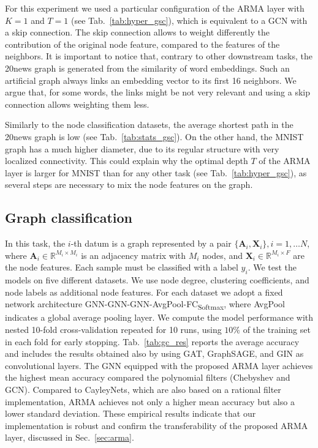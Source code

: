 \documentclass{article}
\def\X{{\mathbf X}}
\def\A{{\mathbf A}}
\begin{document}
For this experiment we used a particular configuration of the ARMA layer with $K=1$ and $T=1$ (see Tab.~\ref{tab:hyper_gsc}), which is equivalent to a GCN with a skip connection.
The skip connection allows to weight differently the contribution of the original node feature, compared to the features of the neighbors.
It is important to notice that, contrary to other downstream tasks, the 20news graph is generated from the similarity of word embeddings. 
Such an artificial graph always links an embedding vector to its first 16 neighbors.
We argue that, for some words, the links might be not very relevant and using a skip connection allows weighting them less.

Similarly to the node classification datasets, the average shortest path in the 20news graph is low (see Tab.~\ref{tab:stats_gsc}).
On the other hand, the MNIST graph has a much higher diameter, due to its regular structure with very localized connectivity.
This could explain why the optimal depth $T$ of the ARMA layer is larger for MNIST than for any other task (see Tab.~\ref{tab:hyper_gsc}), as several steps are necessary to mix the node features on the graph.

\subsection{Graph classification}
In this task, the $i$-th datum is a graph represented by a pair $\{ \A_i, \X_i \}, i=1, \dots N$, where $\A_i \in \mathbb{R}^{M_i \times M_i}$ is an adjacency matrix with $M_i$ nodes, and $\X_i \in \mathbb{R}^{M_i \times F}$ are the node features.
Each sample must be classified with a label $y_i$.
We test the models on five different datasets.
We use node degree, clustering coefficients, and node labels as additional node features.
For each dataset we adopt a fixed network architecture GNN-GNN-GNN-AvgPool-FC\textsubscript{Softmax}, where AvgPool indicates a global average pooling layer.
We compute the model performance with nested 10-fold cross-validation repeated for 10 runs, using $10\%$ of the training set in each fold for early stopping. 
Tab.~\ref{tab:gc_res} reports the average accuracy and includes the results obtained also by using GAT, GraphSAGE, and GIN as convolutional layers.
The GNN equipped with the proposed ARMA layer achieves the highest mean accuracy compared the polynomial filters (Chebyshev and GCN).
Compared to CayleyNets, which are also based on a rational filter implementation, ARMA achieves not only a higher mean accuracy but also a lower standard deviation.
These empirical results indicate that our implementation is robust and confirm the transferability of the proposed ARMA layer, discussed in Sec.~\ref{sec:arma}.
\end{document}
